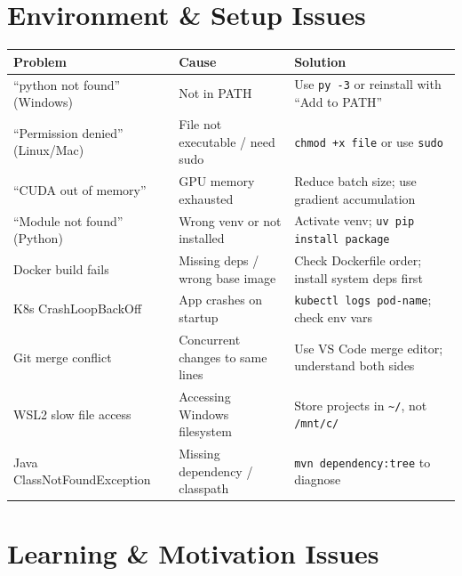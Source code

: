 \documentclass[11pt, a4paper, oneside]{report}
\begin{document}
{{{{{{{{{\section[Environment Issues]{Environment \& Setup Issues}

{\small
{}
\begin{longtable}{L{0.30\textwidth} L{0.32\textwidth} L{0.30\textwidth}}
\toprule
\textbf{Problem} & \textbf{Cause} & \textbf{Solution} \\
\midrule
\endfirsthead
\bottomrule
\endlastfoot
``python not found'' (Windows) & Not in PATH & Use \texttt{py -3} or reinstall with ``Add to PATH'' \\
``Permission denied'' (Linux/Mac) & File not executable / need sudo & \texttt{chmod +x file} or use \texttt{sudo} \\
``CUDA out of memory'' & GPU memory exhausted & Reduce batch size; use gradient accumulation \\
``Module not found'' (Python) & Wrong venv or not installed & Activate venv; \texttt{uv pip install package} \\
Docker build fails & Missing deps / wrong base image & Check Dockerfile order; install system deps first \\
K8s CrashLoopBackOff & App crashes on startup & \texttt{kubectl logs pod-name}; check env vars \\
Git merge conflict & Concurrent changes to same lines & Use VS Code merge editor; understand both sides \\
WSL2 slow file access & Accessing Windows filesystem & Store projects in \texttt{\textasciitilde/}, not \texttt{/mnt/c/} \\
Java ClassNotFoundException & Missing dependency / classpath & \texttt{mvn dependency:tree} to diagnose \\
\end{longtable}

\section[Learning Issues]{Learning \& Motivation Issues}

}}}}}}}}}}
\end{document}
